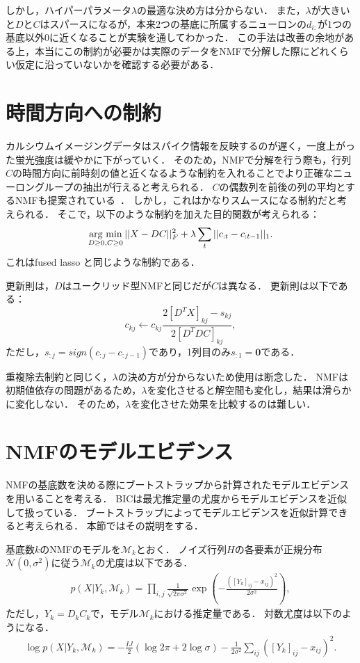 しかし，ハイパーパラメータ$\lambda$の最適な決め方は分からない．
また，$\lambda$が大きいと$D$と$C$はスパースになるが，本来2つの基底に所属するニューロンの$d_{i:}$が1つの基底以外0に近くなることが実験を通してわかった．
この手法は改善の余地がある上，本当にこの制約が必要かは実際のデータをNMFで分解した際にどれくらい仮定に沿っていないかを確認する必要がある．

\section{時間方向への制約}
カルシウムイメージングデータはスパイク情報を反映するのが遅く，一度上がった蛍光強度は緩やかに下がっていく．
そのため，NMFで分解を行う際も，行列$C$の時間方向に前時刻の値と近くなるような制約を入れることでより正確なニューロングループの抽出が行えると考えられる．
$C$の偶数列を前後の列の平均とするNMFも提案されている~\cite{Cheung2015}．
しかし，これはかなりスムースになる制約だと考えられる．
そこで，以下のような制約を加えた目的関数が考えられる：
\begin{equation}
	\mathop{\textrm{arg~min}}\limits_{D \geq 0, C \geq 0}||X - DC||^2_F + \lambda \sum_t||c_{:t} - c_{:t-1}||_1.
  \label{eq:NMF-ar}
\end{equation}
これはfused lasso \cite{Tibshirani2005}と同じような制約である．

更新則は，$D$はユークリッド型NMFと同じだが$C$は異なる．
更新則は以下である：
\begin{equation}
	c_{kj} \leftarrow c_{kj} \frac{2[D^T X]_{kj} - s_{kj}}{2[D^T DC]_{kj}},
\end{equation}
ただし，$s_{:j} = sign(c_{:j} - c_{:j-1})$であり，1列目のみ$s_{:1} = \mathbf{0}$である．

重複除去制約と同じく，$\lambda$の決め方が分からないため使用は断念した．
NMFは初期値依存の問題があるため，$\lambda$を変化させると解空間も変化し，結果は滑らかに変化しない．
そのため，$\lambda$を変化させた効果を比較するのは難しい．

\section{NMFのモデルエビデンス}
NMFの基底数を決める際にブートストラップから計算されたモデルエビデンスを用いることを考える．
BICは最尤推定量の尤度からモデルエビデンスを近似して扱っている．
ブートストラップによってモデルエビデンスを近似計算できると考えられる．
本節ではその説明をする．

基底数$k$のNMFのモデルを$\mathcal{M}_k$とおく．
ノイズ行列$H$の各要素が正規分布$\mathcal{N} (0, \sigma^2)$に従う$\mathcal{M}_k$の尤度は以下である．
\begin{align}
	p(X | Y_k, \mathcal{M}_k) = \prod_{i,j} \frac{1}{\sqrt{2 \pi \sigma^2}} \exp(-\frac{([Y_k]_{ij} - x_{ij})^2}{2 \sigma^2}),
\end{align}
ただし，$Y_k = D_k C_k$で，モデル$\mathcal{M}_k$における推定量である．
対数尤度は以下のようになる．
\begin{align}
	\log p(X | Y_k, \mathcal{M}_k) = - \frac{IJ}{2} (\log 2\pi + 2 \log \sigma) - \frac{1}{2 \sigma^2} \sum_{ij}([Y_k]_{ij} - x_{ij})^2.
\end{align}


